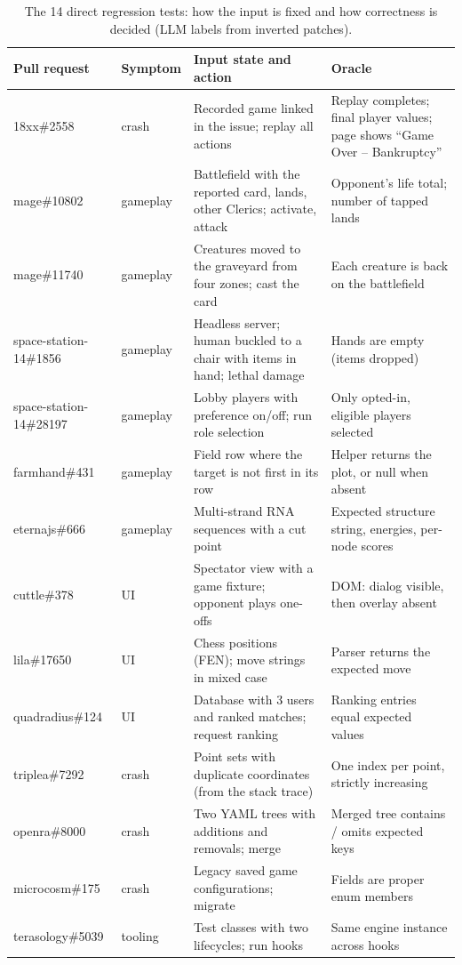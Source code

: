 \documentclass[10pt,twocolumn,a4paper]{article}
\begin{document}
\begin{table}[tb]
\centering
\caption{The 14 direct regression tests: how the input is fixed and how correctness is decided (LLM labels from inverted patches).}\label{tab:direct}
\footnotesize\setlength{\tabcolsep}{3pt}
\begin{tabularx}{\textwidth}{@{}P{30mm}P{14mm}LL@{}}
\toprule
Pull request & Symptom & Input state and action & Oracle\\
\midrule
18xx\#2558 & crash & Recorded game linked in the issue; replay all actions & Replay completes; final player values; page shows ``Game Over -- Bankruptcy''\\
mage\#10802 & gameplay & Battlefield with the reported card, lands, other Clerics; activate, attack & Opponent's life total; number of tapped lands\\
mage\#11740 & gameplay & Creatures moved to the graveyard from four zones; cast the card & Each creature is back on the battlefield\\
space-station-14\#1856 & gameplay & Headless server; human buckled to a chair with items in hand; lethal damage & Hands are empty (items dropped)\\
space-station-14\#28197 & gameplay & Lobby players with preference on/off; run role selection & Only opted-in, eligible players selected\\
farmhand\#431 & gameplay & Field row where the target is not first in its row & Helper returns the plot, or null when absent\\
eternajs\#666 & gameplay & Multi-strand RNA sequences with a cut point & Expected structure string, energies, per-node scores\\
cuttle\#378 & UI & Spectator view with a game fixture; opponent plays one-offs & DOM: dialog visible, then overlay absent\\
lila\#17650 & UI & Chess positions (FEN); move strings in mixed case & Parser returns the expected move\\
quadradius\#124 & UI & Database with 3 users and ranked matches; request ranking & Ranking entries equal expected values\\
triplea\#7292 & crash & Point sets with duplicate coordinates (from the stack trace) & One index per point, strictly increasing\\
openra\#8000 & crash & Two YAML trees with additions and removals; merge & Merged tree contains / omits expected keys\\
microcosm\#175 & crash & Legacy saved game configurations; migrate & Fields are proper enum members\\
terasology\#5039 & tooling & Test classes with two lifecycles; run hooks & Same engine instance across hooks\\
\bottomrule
\end{tabularx}
\end{table}
\end{document}
